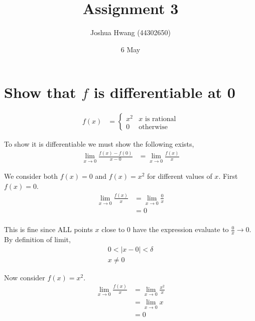 \documentclass{article}
\title{Assignment 3}
\author{Joshua Hwang (44302650)}
\date{6 May}
\begin{document}
\maketitle

\section{Show that $f$ is differentiable at 0}
\begin{align*}
    f(x)
    &=
    \begin{cases}
        x^2 & \text{$x$ is rational} \\
        0 & \text{otherwise}
    \end{cases}
\end{align*}

%

To show it is differentiable we must show the following exists,
\begin{align*}
    \lim_{x \to 0} \frac{f(x) - f(0)}{x - 0}
    &= \lim_{x \to 0} \frac{f(x)}{x}
\end{align*}

We consider both $f(x) = 0$ and $f(x) = x^2$ for different values of $x$.
First $f(x) = 0$.
\begin{align*}
    \lim_{x \to 0} \frac{f(x)}{x} &= \lim_{x \to 0} \frac{0}{x} \\
    &= 0 \\
\end{align*}

This is fine since ALL points $x$ close to 0 have the expression evaluate to
$\frac{0}{x} \to 0$. By definition of limit,
\begin{align*}
0 < |x - 0| < \delta \\
x \neq 0
\end{align*}

Now consider $f(x) = x^2$.
\begin{align*}
    \lim_{x \to 0} \frac{f(x)}{x} &= \lim_{x \to 0} \frac{x^2}{x} \\
    &= \lim_{x \to 0} x \\
    &=  0
\end{align*}
\end{document}
